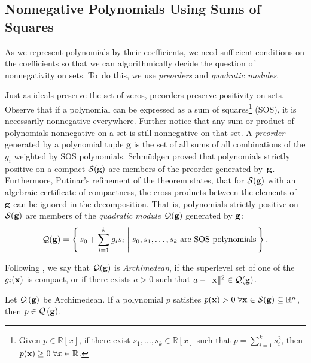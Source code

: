 \subsection{Nonnegative Polynomials Using Sums of Squares}
As we represent polynomials by their coefficients, we need sufficient conditions on the coefficients so that we can algorithmically decide the question of nonnegativity on sets. To~do this, we use \emph{preorders} and \emph{quadratic modules}.

Just as ideals preserve the set of zeros, preorders preserve positivity on sets. Observe that if a polynomial can be expressed as a sum of squares\footnote{Given $p\in \mathbb{R}[x]$, if there exist $s_1,\dots,s_k \in \mathbb{R}[x]$ such that $p = \sum_{i=1}^k s_i^2$, then $p(\mathbf{x})\ge 0\;\forall x\in \mathbb{R}$.} (SOS), it is necessarily nonnegative everywhere. Further notice that any sum or product of polynomials nonnegative on a set is still nonnegative on that set. A \emph{preorder} generated by a polynomial tuple $\mathbf{g}$ is the set of all sums of all combinations of the $g_i$ weighted by SOS polynomials. Schm\"udgen proved \cite[Corollary~3]{Schmudgen1991} that polynomials strictly positive on a compact $\mathcal{S}(\mathbf{g})$ are members of the preorder generated by~$\mathbf{g}$. Furthermore, Putinar's refinement \cite{Putinar1993} of the theorem states, that for $\mathcal{S}(\mathbf{g})$ with an algebraic certificate of compactness, the cross products between the elements of~$\mathbf{g}$ can be ignored in the decomposition. That is, polynomials strictly positive on $\mathcal{S}(\mathbf{g})$ are members of the \emph{quadratic module} \(\mathcal{Q}(\mathbf{g})\) generated by $\mathbf{g}$:
\begin{equation}\label{def:QM}
    \mathcal{Q}(\mathbf{g}) = \left\{\, s_0 + \sum_{i=1}^k g_is_i \;\middle|\; s_0,s_1,\dots,s_k\;\text{are SOS polynomials} \,\right\}.
\end{equation}

\begin{definition}\label{def:archimedean}
Following \textcite[Definition 3.18]{Laurent2009}, we say that \(\mathcal{Q}(\mathbf{g})\) is \emph{Archimedean}, if the superlevel set of one of the \( g_i(\mathbf{x}) \) is compact, or if there exists $a>0$ such that \( a - \|\mathbf{x}\|^2 \in \mathcal{Q}(\mathbf{g})\).
\end{definition}


\begin{theorem}\label{thm:Putinar}
    Let $\mathcal{Q}\left(\mathbf{g}\right)$ be Archimedean. If a polynomial $p$ satisfies $p(\mathbf{x}) > 0\;\forall \mathbf{x} \in \mathcal{S}(\mathbf{g}) \subseteq \mathbb{R}^n$, then $p \in \mathcal{Q}\left(\mathbf{g}\right)$.
\end{theorem}


